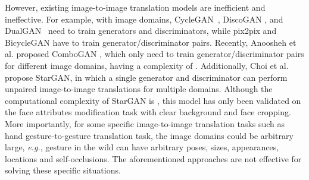 \documentclass[sigconf]{acmart}
\begin{document}
However, existing image-to-image translation models are inefficient and ineffective.
For example, with  image domains, CycleGAN~\cite{zhu2017unpaired}, DiscoGAN \cite{kim2017learning}, and DualGAN~\cite{yi2017dualgan} need to train  generators and discriminators, while pix2pix \cite{isola2017image} and BicycleGAN \cite{zhu2017toward} have to train  generator/discriminator pairs.
Recently, Anoosheh et al. proposed ComboGAN \cite{anoosheh2017combogan}, which only need to train  generator/discriminator pairs for  different image domains, having a complexity of .
Additionally, Choi et al. \cite{choi2017stargan} propose StarGAN, in which a single generator and discriminator can perform unpaired image-to-image translations for multiple domains.
Although the computational complexity of StarGAN is , this model has only been validated on the face attributes modification task with clear background and face cropping.
More importantly, for some specific image-to-image translation tasks  such as hand gesture-to-gesture translation task, 
the image domains could be arbitrary large, \emph{e.g.}, gesture in the wild can have arbitrary poses, sizes, appearances, locations and self-occlusions.
The aforementioned approaches are not effective for solving these specific situations.
\end{document}
